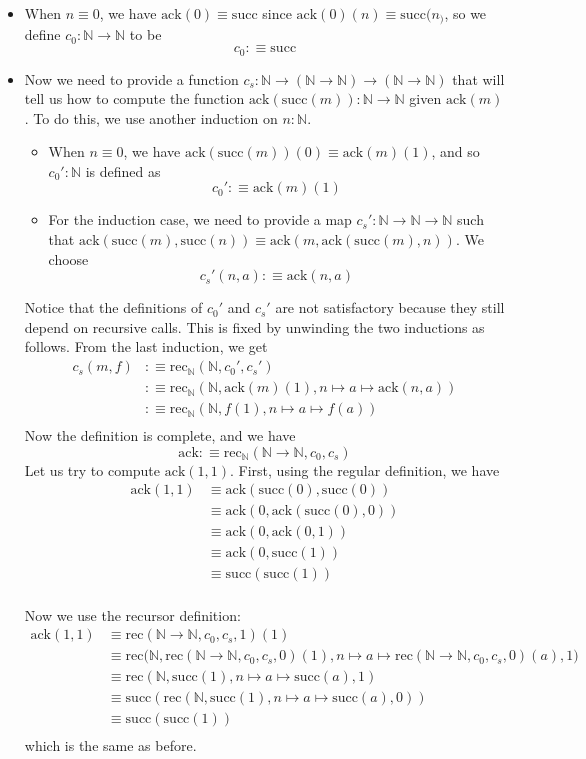 \documentclass[14pt]{extarticle}
\newcommand{\N}{{\mathbb N}}
\newcommand{\0}{{\mathbf 0}}
\newcommand{\1}{{\mathbf 1}}
\newcommand{\2}{{\mathbf 2}}
\newcommand{\mt}{\mapsto}
\newcommand{\rec}{\mathrm{rec}}
\newcommand{\su}{\mathrm{succ}}
\begin{document}
\begin{itemize}
\item When $n \equiv 0$, we have $\text{ack}(0) \equiv \su$ since $\text{ack}(0)(n) \equiv \su(n_)$, so we define $c_0 : \N \to \N$ to be 
\[c_0 :\equiv \su\]
\item Now we need to provide a function $c_s : \N \to (\N \to \N) \to (\N \to \N)$ that will tell us how to compute the function $\text{ack}(\su(m)) : \N \to \N$ given $\text{ack}(m)$. To do this, we use another induction on $n :\N$.
\begin{itemize}
\item When $n \equiv 0$, we have $\text{ack}(\su(m))(0) \equiv \text{ack}(m)(1)$, and so $c_0' : \N$ is defined as \[c_0' :\equiv \text{ack}(m)(1)\]
\item For the induction case, we need to provide a map $c_s' : \N \to \N \to \N$ such that $\text{ack}(\su(m),\su(n)) \equiv \text{ack}(m,\text{ack}(\su(m),n))$. We choose 
\[c_s'(n,a) :\equiv \text{ack}(n,a)\]
\end{itemize}

Notice that the definitions of $c_0'$ and $c_s'$ are not satisfactory because they still depend on recursive calls. This is fixed by unwinding the two inductions as follows. From the last induction, we get
\begin{align*}
c_s(m,f) &:\equiv \rec_\N(\N, c_0',c_s')\\
&:\equiv \rec_\N(\N,\text{ack}(m)(1) ,n \mt a \mt \text{ack}(n,a)) \\
&:\equiv \rec_\N(\N,f(1) ,n \mt a \mt f(a)) \\
\end{align*}
Now the definition is complete, and we have
\[\text{ack} :\equiv \rec_\N(\N \to \N, c_0,c_s)\]
Let us try to compute $\text{ack}(1,1)$. First, using the regular definition, we have
\begin{align*}
\text{ack}(1,1) &\equiv \text{ack}(\su(0),\su(0)) \\
&\equiv \text{ack}(0,\text{ack}(\su(0),0)) \\
&\equiv \text{ack}(0,\text{ack}(0,1)) \\
&\equiv \text{ack}(0,\su(1)) \\
&\equiv \su(\su(1)) \\
\end{align*}

Now we use the recursor definition:
\begin{align*}
\text{ack}(1,1) &\equiv \rec(\N \to \N, c_0,c_s,1)(1) \\
&\equiv \rec\Big(\N, \rec(\N \to \N, c_0,c_s,0)(1), n \mt a \mt \rec(\N \to \N, c_0,c_s,0)(a),1\Big) \\
&\equiv \rec(\N, \su(1), n \mt a \mt \su(a),1) \\
&\equiv \su(\rec(\N, \su(1), n \mt a \mt \su(a),0)) \\
&\equiv \su(\su(1)) \\
\end{align*}
which is the same as before.
\end{itemize}
\end{document}
